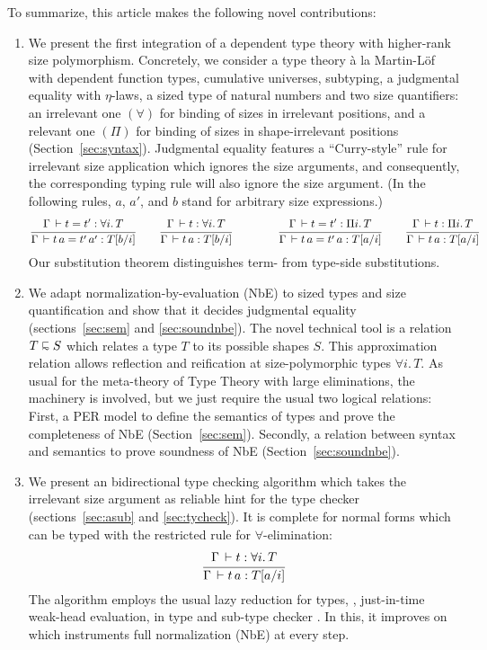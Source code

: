 \documentclass[acmsmall%
]{acmart}\settopmatter{printfolios=true}
\begin{document}
To summarize, this article makes the following novel contributions:
\begin{enumerate}

\item We present the first integration of a dependent type theory with higher-rank size polymorphism.
Concretely, we consider a type theory \`a la Martin-L\"of with dependent function types, cumulative universes, subtyping, a judgmental equality with $\eta$-laws, a sized type of natural numbers and two size quantifiers: an irrelevant one $(\forall)$ for binding of sizes in irrelevant positions, and a relevant one $(\Pi)$ for binding of sizes in shape-irrelevant positions (Section~\ref{sec:syntax}).  Judgmental equality features a ``Curry-style'' rule for irrelevant size application which ignores the size arguments, and consequently, the corresponding typing rule will also ignore the size argument.
(In the following rules, $a$, $a'$, and $b$ stand for arbitrary size expressions.)
\[
\ru{\Gamma \der t = t' : \forall i.\, T
  }{\Gamma \der t\,a = t'\,a' : T[b/i]}
\qquad
\ru{\Gamma \der t : \forall i.\, T
  }{\Gamma \der t\,a : T[b/i]}
\qquad
\qquad
\ru{\Gamma \der t = t' : \Pi i.\, T
  }{\Gamma \der t\,a = t'\,a : T[a/i]}
\qquad
\ru{\Gamma \der t : \Pi i.\, T
  }{\Gamma \der t\,a : T[a/i]}
\]
Our substitution theorem distinguishes term- from type-side substitutions.

\item We adapt normalization-by-evaluation (NbE) to sized types and size quantification and show that it decides judgmental equality (sections~\ref{sec:sem} and \ref{sec:soundnbe}).  The novel technical tool is a relation $T \shape S$ which relates a type $T$ to its possible shapes $S$.  This approximation relation allows reflection and reification at size-polymorphic types $\forall i.\, T$.
As usual for the meta-theory of Type Theory with large eliminations, the machinery is involved, but we just require the usual two logical relations:  First, a PER model to define the semantics of types and prove the completeness of NbE (Section~\ref{sec:sem}).  Secondly, a relation between syntax and semantics to prove soundness of NbE (Section~\ref{sec:soundnbe}).

\item We present an bidirectional type checking algorithm \cite{coquand:type} which takes the irrelevant size argument as reliable hint for the type checker (sections~\ref{sec:asub} and \ref{sec:tycheck}).  It is complete for normal forms which can be typed with the restricted rule for $\forall$-elimination:
\[
\ru{\Gamma \der t : \forall i.\, T
  }{\Gamma \der t\,a : T[a/i]}
\]
The algorithm employs the usual lazy reduction for types, \ie, just-in-time weak-head evaluation, in type and sub-type checker
\cite{huet:wsscs89}.  In this, it improves on \citet{fridlenderPagano:tlca13} which instruments full normalization (NbE) at every step.
\end{enumerate}
\end{document}
